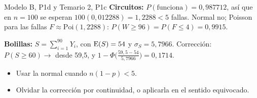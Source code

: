 \begin{modelo}{Modelo B, P1d y Temario 2, P1c}
\textbf{Circuitos:} $P(\text{funciona})=0{,}987712$, así que en $n=100$ se esperan $100(0{,}012288)=1{,}2288<5$ fallas. Normal no; Poisson para las fallas $F\approx\mathrm{Poi}(1{,}2288)$:
$P(W\ge96)=P(F\le4)=0{,}9915$.

\textbf{Bolillas:} $S=\sum_{i=1}^{90}Y_i$, con $\mathrm{E}(S)=54$ y $\sigma_S=5{,}7966$. Corrección: $P(S\ge60)\to$ desde 59,5, y $1-\Phi\big(\frac{59{,}5-54}{5{,}7966}\big)=0{,}1714$.
\end{modelo}
\begin{ojo}
\begin{itemize}
\item Usar la normal cuando $n(1-p)<5$.
\item Olvidar la corrección por continuidad, o aplicarla en el sentido equivocado.
\end{itemize}
\end{ojo}

